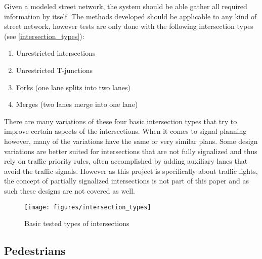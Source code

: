 Given a modeled street network, the system should be able gather all required information by itself. The methods developed should be applicable to any kind of street network, however tests are only done with the following intersection types (see \autoref{intersection_types}):

\begin{enumerate}
	\item Unrestricted intersections
	\item Unrestricted T-junctions
	\item Forks (one lane splits into two lanes)
	\item Merges (two lanes merge into one lane)
\end{enumerate}

There are many variations of these four basic intersection types that try to improve certain aspects of the intersections. When it comes to signal planning however, many of the variations have the same or very similar plans. Some design variations are better suited for intersections that are not fully signalized and thus rely on traffic priority rules, often accomplished by adding auxiliary lanes that avoid the traffic signals. However as this project is specifically about traffic lights, the concept of partially signalized intersections is not part of this paper and as such these designs are not covered as well.

\begin{figure}[ht]
	\centering
	\texttt{[image: figures/intersection\_types]}
	\caption{Basic tested types of intersections}
	\label{intersection_types}
\end{figure}

\subsection*{Pedestrians}

